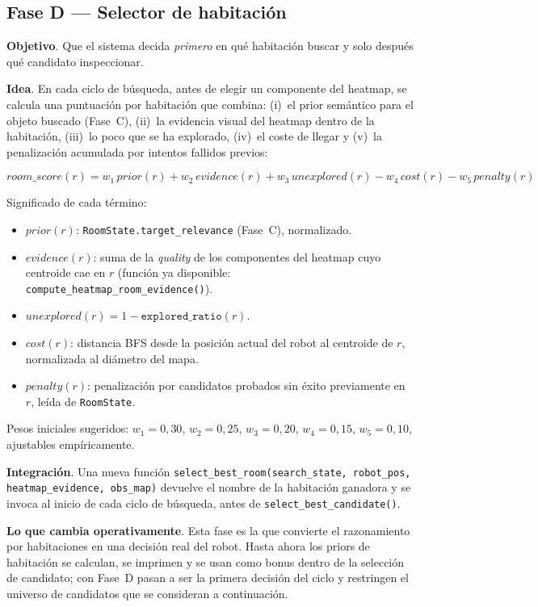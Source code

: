\documentclass[11pt,a4paper]{article}
\begin{document}
\subsection{Fase D --- Selector de habitación}

\textbf{Objetivo}. Que el sistema decida \emph{primero} en qué habitación
buscar y solo después qué candidato inspeccionar.

\textbf{Idea}. En cada ciclo de búsqueda, antes de elegir un componente del
heatmap, se calcula una puntuación por habitación que combina: (i)~el prior
semántico para el objeto buscado (Fase~C), (ii)~la evidencia visual del
heatmap dentro de la habitación, (iii)~lo poco que se ha explorado, (iv)~el
coste de llegar y (v)~la penalización acumulada por intentos fallidos
previos:

\[
  \textit{room\_score}(r) =
    w_1\,\textit{prior}(r)
  + w_2\,\textit{evidence}(r)
  + w_3\,\textit{unexplored}(r)
  - w_4\,\textit{cost}(r)
  - w_5\,\textit{penalty}(r)
\]

Significado de cada término:

\begin{itemize}
  \item $\textit{prior}(r)$: \texttt{RoomState.target\_relevance}
        (Fase~C), normalizado.
  \item $\textit{evidence}(r)$: suma de la \textit{quality} de los
        componentes del heatmap cuyo centroide cae en $r$ (función ya
        disponible: \texttt{compute\_heatmap\_room\_evidence()}).
  \item $\textit{unexplored}(r) = 1 - \texttt{explored\_ratio}(r)$.
  \item $\textit{cost}(r)$: distancia BFS desde la posición actual del robot
        al centroide de $r$, normalizada al diámetro del mapa.
  \item $\textit{penalty}(r)$: penalización por candidatos probados sin éxito
        previamente en $r$, leída de \texttt{RoomState}.
\end{itemize}

Pesos iniciales sugeridos: $w_1=0{,}30$, $w_2=0{,}25$, $w_3=0{,}20$,
$w_4=0{,}15$, $w_5=0{,}10$, ajustables empíricamente.

\textbf{Integración}. Una nueva función
\texttt{select\_best\_room(search\_state, robot\_pos, heatmap\_evidence,
obs\_map)} devuelve el nombre de la habitación ganadora y se invoca al inicio
de cada ciclo de búsqueda, antes de \texttt{select\_best\_candidate()}.

\textbf{Lo que cambia operativamente}. Esta fase es la que convierte el
razonamiento por habitaciones en una decisión real del robot. Hasta ahora los
priors de habitación se calculan, se imprimen y se usan como bonus dentro de
la selección de candidato; con Fase~D pasan a ser la primera decisión del
ciclo y restringen el universo de candidatos que se consideran a continuación.
\end{document}
